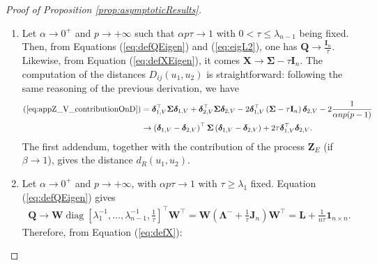 \documentclass[12pt]{article}
\theoremstyle{plain}
\theoremstyle{remark}
\newcommand{\round}[1]{\left( #1 \right)}
\newcommand{\onenn}[0]{{\mathbf{1}_{n\times n}}}
\newcommand{\dVec}[1]{{\bm{#1}}}            %
\newcommand{\latMatr}[1]{\mathbf{#1}}          %
\newcommand{\grMatr}[1]{{\boldsymbol{#1}}}   %
\newcommand{\rVec}[1]{{\bm{#1}}}            %
\DeclareMathOperator{\diag}{diag}
\begin{document}
\begin{proof}[Proof of Proposition \ref{prop:asymptoticResults}]
\begin{enumerate}
            \item {Let $\alpha \to 0^+$ and $p \to +\infty$ such that $\alpha p \tau \to 1$ with $0 < \tau \leq \lambda_{n-1}$ being fixed. Then, from Equations (\ref{eq:defQEigen}) and (\ref{eq:eigL2}), one has $\latMatr{Q} \to \frac{\latMatr{I}_n}{\tau}$. Likewise, from Equation (\ref{eq:defXEigen}), it comes $\latMatr{X} \to \grMatr{\Sigma}-\tau\latMatr{I}_n$.} {The computation of the distances $D_{ij}(u_1,u_2)$ is straightforward: following the same reasoning of the previous derivation, we have 
            \begin{align*}
                (\ref{eq:appZ_V_contributionOnD})
                &=\dVec{\delta}_{ {1,V}}^\top {\grMatr{\Sigma}} \dVec{\delta}_{ {1,V}} + \dVec{\delta}_{ {2,V}}^\top {\grMatr{\Sigma}} \dVec{\delta}_{ {2,V}}-2\dVec{\delta}_{ {1,V}}^\top \round{\grMatr{\Sigma} - \tau \latMatr I_n} \dVec{\delta}_{ {2,V}} -2\frac{1}{\alpha n p (p-1)}\\
                &\to \round{\dVec \delta_{1,V}-\dVec \delta_{2,V}}^\top \grMatr{\Sigma} \round{\dVec \delta_{1,V}-\dVec \delta_{2,V}} + 2\tau \dVec \delta_{1,V}^\top \dVec \delta_{2,V}.
            \end{align*}
            The first addendum, together with the contribution of the process $\rVec Z_E$ (if $\beta \to 1$), gives the distance $d_R(u_1,u_2)$.
            } 
            \item {Let $\alpha \to 0^+$ and $p\to + \infty $, with $\alpha p \tau \to 1$ with $\tau \geq \lambda_1$ fixed. Equation (\ref{eq:defQEigen}) gives
            \begin{align*}
                \latMatr Q \to \latMatr W \diag{[\lambda_1^{-1},\ldots,\lambda_{n-1}^{-1},\frac{1}{\tau}]^\top} \latMatr W^\top = \latMatr W \round{\grMatr{\Lambda}^- + \frac{1}{\tau} \latMatr J_n} \latMatr W^\top = \latMatr L + \frac{1}{n\tau}\onenn.
            \end{align*}
            Therefore, from Equation (\ref{eq:defX}):
}
\end{enumerate}
\end{proof}
\end{document}
